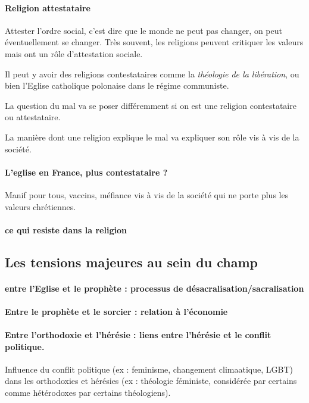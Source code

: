\paragraph{Religion attestataire} Attester l'ordre social, c'est dire que le monde ne peut pas changer, on peut éventuellement se changer. Très souvent, les religions peuvent critiquer les valeurs mais ont un rôle d'attestation sociale.

\begin{Ex}
    Il peut y avoir des religions contestataires comme la \textit{théologie de la libération}, ou bien l'Eglise catholique polonaise dans le régime communiste. 
\end{Ex}

La question du mal va se poser différemment si on est une religion contestataire ou attestataire.
\begin{Ex}
    La manière dont une religion explique le mal va expliquer son rôle vis à vis de la société. 
\end{Ex}

\paragraph{L'eglise en France, plus contestataire ?} Manif pour tous, vaccins, méfiance vis à vis de la société qui ne porte plus les valeurs chrétiennes.


\paragraph{ce qui resiste dans la religion}
      
      
      \subsection{ Les tensions majeures au sein du champ }

      \paragraph{entre l’Eglise et le prophète : processus de désacralisation/sacralisation }
      \paragraph{Entre le prophète et le sorcier : relation à l’économie}
      \paragraph{ Entre l’orthodoxie et l’hérésie : liens entre l’hérésie et le conflit politique.  }  Influence du conflit politique (ex : feminisme, changement climaatique, LGBT) dans les orthodoxies et hérésies (ex : théologie féministe, considérée par certains comme hétérodoxes par certains théologiens).
          
